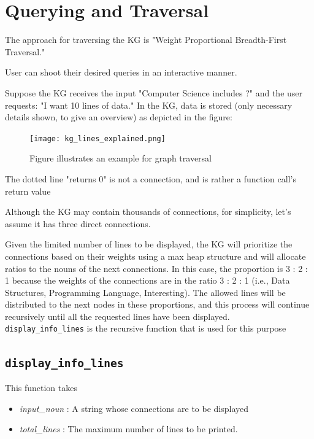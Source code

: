 \documentclass[conference]{IEEEtran}
\begin{document}
\section{Querying and Traversal}


The approach for traversing the KG is "Weight Proportional Breadth-First 
Traversal."

User can shoot their desired queries in an interactive manner. 

Suppose the KG receives the input "Computer Science includes ?" and the user requests: "I want 10 lines of data."
In the KG, data is stored (only necessary details shown, to give an overview) as depicted in the figure:

\begin{figure}[htbp]
\centering
\texttt{[image: kg\_lines\_explained.png]} %
\caption{Figure illustrates an example for graph traversal}
\label{fig}
\end{figure}

The dotted line "returns 0" is not a connection, and is rather a function call's return value

Although the KG may contain thousands of connections, for simplicity, let's assume it has three direct connections.

Given the limited number of lines to be displayed, the KG will prioritize the connections based on their weights using a max heap structure and will allocate ratios to the nouns of the next connections. In this case, the proportion is 3 : 2 : 1 
because the weights of the connections are in the ratio 3 : 2 : 1 (i.e., Data Structures, Programming Language, Interesting). The allowed lines will be distributed to the next nodes in these proportions, and this process will continue recursively until all the requested lines have been displayed.\\

\texttt{display\_info\_lines} is the recursive function that is used for this purpose



\subsection{\textbf{\texttt{display\_info\_lines}}}

This function takes
\begin{itemize}
\item \textit{input\_noun} : A string whose connections are to be displayed
\item \textit{total\_lines} : The maximum number of lines to be printed. 
\end{itemize}
\end{document}
